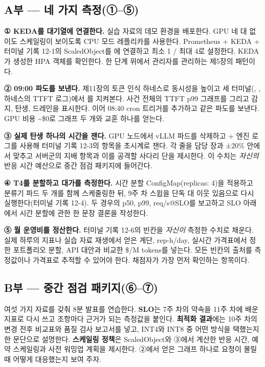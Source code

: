 \subsection*{A부 — 네 가지 측정(①–⑤)}

\begin{tbbitemize}
  \item \textbf{① KEDA를 대기열에 연결한다.} 실습 자료의 데모 환경을 배포한다. GPU 네 대 없이도 스케일링이 보이도록 CPU 모드 레플리카를 사용한다. Prometheus + KEDA + 터미널 기록 12-1의 ScaledObject를 에 연결하고 최소 1 / 최대 4로 설정한다. KEDA가 생성한 HPA 객체를 확인한다. 한 단계 위에서 관리자를 관리하는 제5장의 패턴이다.
  \item \textbf{② 09:00 파도를 보낸다.} 제11장의 토큰 인식 하네스로 동시성을 높이고 세 터미널(, , 하네스의 TTFT 로그)에서 를 지켜본다. 사건 전체의 TTFT p99 그래프를 그리고 감지, 탄생, 드레인을 표시한다. 이어 08:40 cron 트리거를 추가하고 같은 파도를 보낸다. GPU 비용 \textasciitilde{}\$0로 그래프 두 개와 교훈 하나를 얻는다.
  \item \textbf{③ 실제 탄생 하나의 시간을 잰다.} GPU 노드에서 vLLM 파드를 삭제하고  + 엔진 로그를 사용해 터미널 기록 12-3의 항목을 초시계로 잰다. 각 줄을 담당 장과 ±20\% 안에서 맞추고 서버군의 지배 항목과 이를 공격할 사다리 단을 제시한다. 이 수치는 \textit{자신의} 반응 시간 예산으로 중간 점검 패키지에 들어간다.
  \item \textbf{④ T4를 분할하고 대가를 측정한다.} 시간 분할 ConfigMap(replicas: 4)을 적용하고 분류기 파드 두 개를 함께 스케줄링한 뒤, 9주 차 스윕을 단독 대 이웃 있음으로 다시 실행한다(터미널 기록 12-4). 두 경우의 p50, p99, req/s@SLO를 보고하고 SLO 아래에서 시간 분할에 관한 한 문장 결론을 작성한다.
  \item \textbf{⑤ 월 운영비를 정산한다.} 터미널 기록 12-6의 빈칸을 \textit{자신이} 측정한 수치로 채운다. 실제 하루의 지표나 실습 자료 재생에서 얻은 계단, rep-h/day, 실시간 가격표에서 정한 포트폴리오 분할, API 대안과 비교한 \$/M tokens를 넣는다. 모든 빈칸의 출처를 측정값이나 가격표로 추적할 수 있어야 한다. 채점자가 가장 먼저 확인하는 항목이다.
\end{tbbitemize}

\subsection*{B부 — 중간 점검 패키지(⑥–⑦)}

여섯 가지 자료를 갖춰 8분 발표를 연습한다. \textbf{SLO}는 7주 차의 약속을 11주 차에 배운 지표로 다시 쓰고 조항마다 근거가 되는 측정값을 붙인다. \textbf{최적화 결과}에는 10주 차의 변경 전후 비교표와 품질 검사 보고서를 넣고, INT4와 INT8 중 어떤 방식을 택했는지 한 문단으로 설명한다. \textbf{스케일링 정책}은 ScaledObject와 ③에서 계산한 반응 시간, 예약 스케일링과 사전 워밍업 계획을 제시한다. ②에서 얻은 그래프 하나로 요청이 몰릴 때 어떻게 대응했는지 보여 주자.

